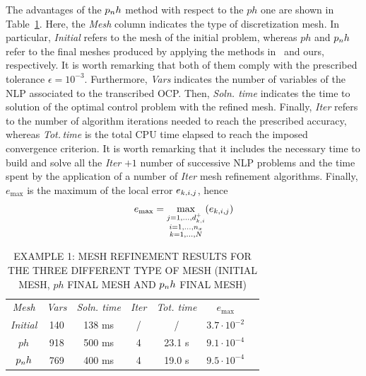 The advantages of the $p_{n}h$ method with respect to the $ph$ one are shown in Table~\ref{tab:tablevanderpol}. Here, the \emph{Mesh} column indicates the type of discretization mesh. In particular, \emph{Initial} refers to the mesh of the initial problem, whereas $ph$ and $p_{n}h$ refer to the final meshes produced by applying the methods in~\cite{Patterson:OCAM:2015} and ours, respectively. It is worth remarking that both of them comply with the prescribed tolerance $\epsilon=10^{-3}$. Furthermore, \emph{Vars} indicates the number of variables of the NLP associated to the transcribed OCP. Then, \emph{Soln. time} indicates the time to solution of the optimal control problem with the refined mesh. Finally, \emph{Iter} refers to the number of algorithm iterations needed to reach the prescribed accuracy, whereas \emph{Tot.\,time} is the total CPU time elapsed to reach the imposed convergence criterion. It is worth remarking that it includes the necessary time to build and solve all the \emph{Iter} $+1$ number of successive NLP problems and the time spent by the application of a number of \emph{Iter} mesh refinement algorithms. Finally, $e_{\max}$  is the maximum of the local error $e_{k,i,j}$, hence
\begin{equation}
e_\text{max}= \max\limits_{\substack{j = 1, \dots, d_{k,i}^{+} \\ i = 1, \dots, n_x \\ k = 1, \dots, N}} (e_{k,i,j})
\end{equation}
\begin{table}[t]
	\caption{EXAMPLE 1: MESH REFINEMENT RESULTS FOR THE THREE DIFFERENT TYPE OF MESH (INITIAL MESH, $ph$ FINAL MESH AND $p_{n}h$ FINAL MESH)}
	\begin{center}
		\label{tab:tablevanderpol}
		\begin{tabular}{c c c c c c c}
			& & \\ %
			\hline
			\emph{Mesh} & \emph{Vars} & \emph{Soln. time} & \emph{Iter} & \emph{Tot. time} & $e_\text{max}$ \\
			\hline
			\emph{Initial} & 140 & 138 ms & / & / &  $3.7\cdot 10^{-2}$\\
			$ph$ & 918 & 500 ms & 4 & 23.1 s & $9.1\cdot 10^{-4}$ \\
			$p_{n}h$ & 769 & 400 ms & 4 & 19.0 s & $9.5\cdot 10^{-4}$ \\
			\hline
		\end{tabular}
	\end{center}
\end{table}

